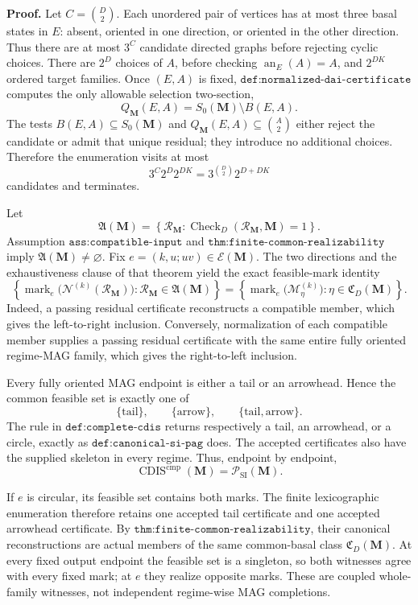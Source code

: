 \textbf{Proof.}
Let \(C=\binom D2\).  Each unordered pair of vertices has at most three basal states in \(E\): absent, oriented in one direction, or oriented in the other direction.  Thus there are at most \(3^C\) candidate directed graphs before rejecting cyclic choices.  There are \(2^D\) choices of \(A\), before checking \(\operatorname{an}_E(A)=A\), and \(2^{DK}\) ordered target families.  Once \((E,A)\) is fixed, \(\texttt{def:normalized-dai-certificate}\) computes the only allowable selection two-section,
\[
Q_{\mathbf M}(E,A)=S_0(\mathbf M)\setminus B(E,A).
\]
The tests \(B(E,A)\subseteq S_0(\mathbf M)\) and \(Q_{\mathbf M}(E,A)\subseteq\binom A2\) either reject the candidate or admit that unique residual; they introduce no additional choices.  Therefore the enumeration visits at most
\[
3^C2^D2^{DK}=3^{\binom D2}2^{D+DK}
\]
candidates and terminates.

Let
\[
\mathfrak A(\mathbf M)
=\left\{\mathcal R_{\mathbf M}:
\operatorname{Check}_{D}(\mathcal R_{\mathbf M},\mathbf M)=1\right\}.
\]
Assumption \(\texttt{ass:compatible-input}\) and \(\texttt{thm:finite-common-realizability}\) imply \(\mathfrak A(\mathbf M)\ne\varnothing\).  Fix \(e=(k,u;uv)\in\mathcal E(\mathbf M)\).  The two directions and the exhaustiveness clause of that theorem yield the exact feasible-mark identity
\[
\left\{
\operatorname{mark}_e\bigl(\mathcal N^{(k)}(\mathcal R_{\mathbf M})\bigr):
\mathcal R_{\mathbf M}\in\mathfrak A(\mathbf M)
\right\}
=
\left\{
\operatorname{mark}_e\bigl(\mathcal M_\eta^{(k)}\bigr):
\eta\in\mathfrak C_D(\mathbf M)
\right\}.
\]
Indeed, a passing residual certificate reconstructs a compatible member, which gives the left-to-right inclusion.  Conversely, normalization of each compatible member supplies a passing residual certificate with the same entire fully oriented regime-MAG family, which gives the right-to-left inclusion.

Every fully oriented MAG endpoint is either a tail or an arrowhead.  Hence the common feasible set is exactly one of
\[
\{\mathrm{tail}\},
\qquad
\{\mathrm{arrow}\},
\qquad
\{\mathrm{tail},\mathrm{arrow}\}.
\]
The rule in \(\texttt{def:complete-cdis}\) returns respectively a tail, an arrowhead, or a circle, exactly as \(\texttt{def:canonical-si-pag}\) does.  The accepted certificates also have the supplied skeleton in every regime.  Thus, endpoint by endpoint,
\[
\operatorname{CDIS}^{\mathrm{cmp}}(\mathbf M)
=\mathcal P_{\mathrm{SI}}(\mathbf M).
\]

If \(e\) is circular, its feasible set contains both marks.  The finite lexicographic enumeration therefore retains one accepted tail certificate and one accepted arrowhead certificate.  By \(\texttt{thm:finite-common-realizability}\), their canonical reconstructions are actual members of the same common-basal class \(\mathfrak C_D(\mathbf M)\).  At every fixed output endpoint the feasible set is a singleton, so both witnesses agree with every fixed mark; at \(e\) they realize opposite marks.  These are coupled whole-family witnesses, not independent regime-wise MAG completions.

